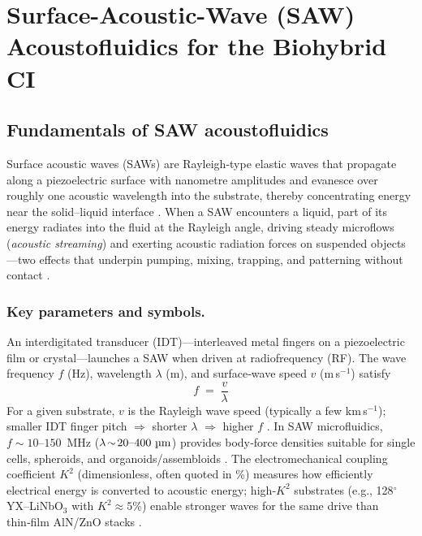 \documentclass[referee,pdflatex, sn-vancouver-num]{sn-jnl}%
\theoremstyle{thmstyleone}%
\theoremstyle{thmstyletwo}%
\theoremstyle{thmstylethree}%
\begin{document}
\section{Surface-Acoustic-Wave (SAW) Acoustofluidics for the Biohybrid CI}\label{sec7}
\subsection{Fundamentals of SAW acoustofluidics}
Surface acoustic waves (SAWs) are Rayleigh‑type elastic waves that propagate along a piezoelectric surface with nanometre amplitudes and evanesce over roughly one acoustic wavelength into the substrate, thereby concentrating energy near the solid–liquid interface \cite{Friend2011,Yeo2014_SAWmicrofluidics}. When a SAW encounters a liquid, part of its energy radiates into the fluid at the Rayleigh angle, driving steady microflows (\emph{acoustic streaming}) and exerting acoustic radiation forces on suspended objects—two effects that underpin pumping, mixing, trapping, and patterning without contact \cite{Ding2013,Gedge2012_SAW, Friend2011,Yeo2014_SAWmicrofluidics}.

\subsubsection{Key parameters and symbols.}
An interdigitated transducer (IDT)—interleaved metal fingers on a piezoelectric film or crystal—launches a SAW when driven at radiofrequency (RF). The wave frequency \(f\) (Hz), wavelength \(\lambda\) (m), and surface‑wave speed \(v\) (m\,s\(^{-1}\)) satisfy
\[
f \;=\; \frac{v}{\lambda}
\]
For a given substrate, \(v\) is the Rayleigh wave speed (typically a few km\,s\(^{-1}\)); smaller IDT finger pitch \(\Rightarrow\) shorter \(\lambda\) \(\Rightarrow\) higher \(f\) \cite{Friend2011,Yeo2014_SAWmicrofluidics, Bruus2015_Governing_Equations}. In SAW microfluidics, \(f\!\sim\!10\text{–}150\)~MHz (\(\lambda\!\sim\!20\text{–}400~\text{\textmu m}\)) provides body‑force densities suitable for single cells, spheroids, and organoids/assembloids \cite{Shilton2008_NanoDisp,Gedge2012_SAW}. The electromechanical coupling coefficient \(K^2\) (dimensionless, often quoted in \%) measures how efficiently electrical energy is converted to acoustic energy; high‑\(K^2\) substrates (e.g., 128$^{\circ}$ YX–LiNbO\(_3\) with \(K^2\!\approx\!5\%\)) enable stronger waves for the same drive than thin‑film AlN/ZnO stacks \cite{Campbell1998,Yeo2014_SAWmicrofluidics}.
\end{document}

